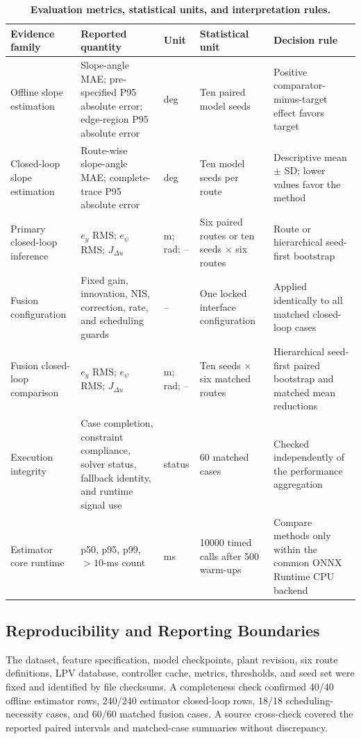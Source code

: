 \documentclass{ieeeaccess}
\begin{document}
\begin{table}[!tbp]
\centering
\caption{\textbf{Evaluation metrics, statistical units, and interpretation rules.}}
\label{tab:evaluation_protocol}
\scriptsize
\setlength{\tabcolsep}{3pt}
\begin{tabular}{|p{}|p{}|p{}|p{}|p{}|}
\hline
Evidence family & Reported quantity & Unit & Statistical unit & Decision rule \\
\hline
Offline slope estimation & Slope-angle MAE; pre-specified P95 absolute error; edge-region P95 absolute error & deg & Ten paired model seeds & Positive comparator-minus-target effect favors target \\
Closed-loop slope estimation & Route-wise slope-angle MAE; complete-trace P95 absolute error & deg & Ten model seeds per route & Descriptive mean $\pm$ SD; lower values favor the method \\
Primary closed-loop inference & $e_y$ RMS; $e_\psi$ RMS; $J_{\Delta u}$ & m; rad; -- & Six paired routes or ten seeds $\times$ six routes & Route or hierarchical seed-first bootstrap \\
Fusion configuration & Fixed gain, innovation, NIS, correction, rate, and scheduling guards & -- & One locked interface configuration & Applied identically to all matched closed-loop cases \\
Fusion closed-loop comparison & $e_y$ RMS; $e_\psi$ RMS; $J_{\Delta u}$ & m; rad; -- & Ten seeds $\times$ six matched routes & Hierarchical seed-first paired bootstrap and matched mean reductions \\
Execution integrity & Case completion, constraint compliance, solver status, fallback identity, and runtime signal use & status & 60 matched cases & Checked independently of the performance aggregation \\
Estimator core runtime & p50, p95, p99, $>10$-ms count & ms & 10000 timed calls after 500 warm-ups & Compare methods only within the common ONNX Runtime CPU backend \\
\hline
\end{tabular}
\end{table}

\subsection{Reproducibility and Reporting Boundaries}

The dataset, feature specification, model checkpoints, plant revision, six route definitions, LPV database, controller cache, metrics, thresholds, and seed set were fixed and identified by file checksums. A completeness check confirmed 40/40 offline estimator rows, 240/240 estimator closed-loop rows, 18/18 scheduling-necessity cases, and 60/60 matched fusion cases. A source cross-check covered the reported paired intervals and matched-case summaries without discrepancy.
\end{document}
